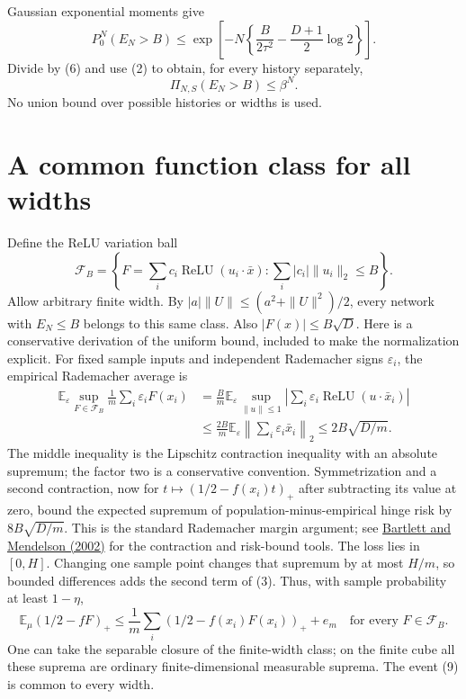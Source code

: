 \documentclass[11pt]{article}
\newcommand{\E}{\mathbb E}\newcommand{\R}{\mathbb R}
\newcommand{\relu}{\operatorname{ReLU}}\newcommand{\Prb}{\mathbb P}
\begin{document}
Gaussian exponential moments give
\[
 P_0^N(E_N>B)
 \le\exp\left[-N\left\{\frac{B}{2\tau^2}
                              -\frac{D+1}{2}\log2\right\}\right].
\]
Divide by (6) and use (2) to obtain, for every history separately,
\[
                         \Pi_{N,S}(E_N>B)\le\beta^N.      \tag{7}
\]
No union bound over possible histories or widths is used.

\section{A common function class for all widths}
Define the ReLU variation ball
\[
 \mathcal F_B=\left\{F=\sum_i c_i\relu(u_i\cdot\bar x):
                       \sum_i|c_i|\|u_i\|_2\le B\right\}.
\]
Allow arbitrary finite width. By $|a|\|U\|\le(a^2+\|U\|^2)/2$,
every network with $E_N\le B$ belongs to this same class. Also
$|F(x)|\le B\sqrt D$.
Here is a conservative derivation of the uniform bound, included to make
the normalization explicit. For fixed sample inputs and independent
Rademacher signs $\varepsilon_i$, the empirical Rademacher average is
\begin{align*}
 \E_\varepsilon\sup_{F\in\mathcal F_B}
        \frac1m\sum_i\varepsilon_i F(x_i)
 &=\frac Bm\E_\varepsilon\sup_{\|u\|\le1}
                     \left|\sum_i\varepsilon_i\relu(u\cdot\bar x_i)\right|\\
 &\le\frac{2B}{m}\E_\varepsilon
                         \left\|\sum_i\varepsilon_i\bar x_i\right\|_2
 \le2B\sqrt{D/m}.                                       \tag{8}
\end{align*}
The middle inequality is the Lipschitz contraction inequality with an
absolute supremum; the factor two is a conservative convention.
Symmetrization and a second contraction, now for
$t\mapsto(1/2-f(x_i)t)_+$ after subtracting its value at zero, bound the
expected supremum of population-minus-empirical hinge risk by
$8B\sqrt{D/m}$. This is the standard Rademacher margin argument;
see \href{https://www.jmlr.org/papers/volume3/bartlett02a/bartlett02a.pdf}
{Bartlett and Mendelson (2002)} for the contraction and risk-bound tools.
The loss lies in $[0,H]$. Changing one sample point changes that supremum
by at most $H/m$, so bounded differences adds the second term of (3).
Thus, with sample probability at least $1-\eta$,
\[
 \E_\mu(1/2-fF)_+
 \le\frac1m\sum_i(1/2-f(x_i)F(x_i))_++e_m
                              \quad\text{for every }F\in\mathcal F_B. \tag{9}
\]
One can take the separable closure of the finite-width class; on the
finite cube all these suprema are ordinary finite-dimensional measurable
suprema. The event (9) is common to every width.
\end{document}

